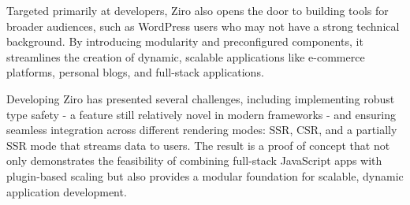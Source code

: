 Targeted primarily at developers, Ziro also opens the door to building tools for broader audiences, such as WordPress users who may not have a strong technical background. By introducing modularity and preconfigured components, it streamlines the creation of dynamic, scalable applications like e-commerce platforms, personal blogs, and full-stack applications.

Developing Ziro has presented several challenges, including implementing robust type safety - a feature still relatively novel in modern frameworks - and ensuring seamless integration across different rendering modes: SSR, CSR, and a partially SSR mode that streams data to users. The result is a proof of concept that not only demonstrates the feasibility of combining full-stack JavaScript apps with plugin-based scaling but also provides a modular foundation for scalable, dynamic application development.



\pagebreak
